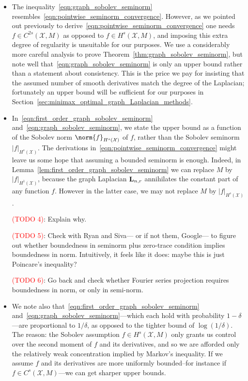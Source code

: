 \documentclass{article}
\newcommand{\1}{\mathbf{1}}
\newcommand{\Lap}{{\bf L}}
\newcommand{\Xset}{\mathcal{X}}
\theoremstyle{alden}
\theoremstyle{aldenthm}
\theoremstyle{definition}
\theoremstyle{remark}
\begin{document}
\begin{itemize}
	\item 
	The inequality~\eqref{eqn:graph_sobolev_seminorm} resembles~\eqref{eqn:pointwise_seminorm_convergence}. However, as we pointed out previously to derive~\eqref{eqn:pointwise_seminorm_convergence} one needs $f \in C^{2s}(\Xset,M)$ as opposed to $f \in H^s(\Xset,M)$, and imposing this extra degree of regularity is unsuitable for our purposes. We use a considerably more careful analysis to prove Theorem~\eqref{thm:graph_sobolev_seminorm}, but note well that~\eqref{eqn:graph_sobolev_seminorm} is only an upper bound rather than a statement about consistency. This is the price we pay for insisting that the assumed number of smooth derivatives match the degree of the Laplacian; fortunately an upper bound will be sufficient for our purposes in Section~\ref{sec:minimax_optimal_graph_Laplacian_methods}.
	
	\item In~\eqref{eqn:first_order_graph_sobolev_seminorm} and~\eqref{eqn:graph_sobolev_seminorm}, we state the upper bound as a function of the Sobolev norm $\norm{f}_{H^s(\Xset)}$ of $f$, rather than the Sobolev seminorm $|f|_{H^s(\Xset)}$. The derivations in~\eqref{eqn:pointwise_seminorm_convergence} might leave us some hope that assuming a bounded seminorm is enough. Indeed, in Lemma~\ref{lem:first_order_graph_sobolev_seminorm} we can replace $M$ by $|f|_{H^1(\Xset)}$, because the graph Laplacian $\Lap_{n,r}$ annihilates the constant part of any function $f$. However in the latter case, we may not replace $M$ by $|f|_{H^s(\Xset)}$. 
	
	\textcolor{red}{(TODO 4)}: Explain why.
	
	\textcolor{red}{(TODO 5)}: Check with Ryan and Siva--- or if not them, Google--- to figure out whether boundedness in seminorm plus zero-trace condition implies boundedness in norm. Intuitively, it feels like it does: maybe this is just Poincare's inequality?
	
	\textcolor{red}{(TODO 6)}: Go back and check whether Fourier series projection requires boundedness in norm, or only in semi-norm.
	\item We note also that~\eqref{eqn:first_order_graph_sobolev_seminorm} and~\eqref{eqn:graph_sobolev_seminorm}---which each hold with probability $1 - \delta$---are proportional to $1/\delta$, as opposed to the tighter bound of $\log(1/\delta)$. The reason: the Sobolev assumption $f \in H^s(\Xset,M)$ only grants us control over the second moment of $f$ and its derivatives, and so we are afforded only the relatively weak concentration implied by Markov's inequality. If we assume $f$ and its derivatives are more uniformly bounded--for instance if $f \in C^s(\Xset,M)$---we can get sharper upper bounds.
\end{itemize}
\end{document}
